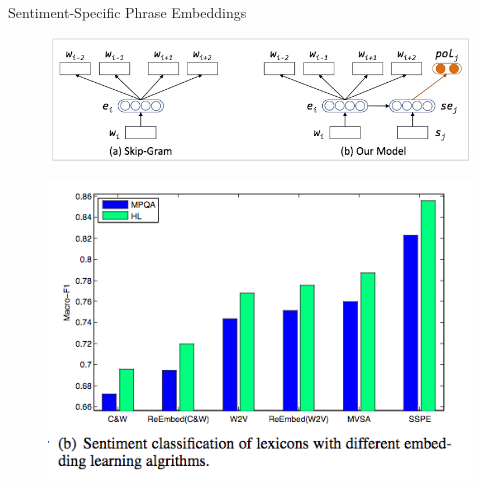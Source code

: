 \documentclass[handout]{beamer}
\begin{document}
\begin{frame}{Sentiment-Specific Phrase Embeddings}


  \begin{figure}[h]
        	\includegraphics[scale = 0.4]{pics/SSPE.png}
        \end{figure}

  \begin{figure}[h]
        	\includegraphics[scale = 0.3]{pics/SSPERes.png}
        \end{figure}


\end{frame}
\end{document}
